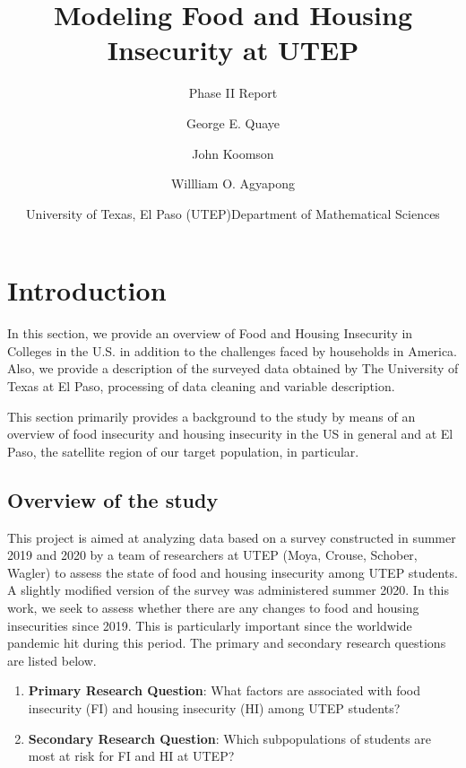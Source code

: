 \documentclass[
  10pt,
]{article}
\title{Modeling Food and Housing Insecurity at UTEP}
\subtitle{Phase II Report}
\author{George E. Quaye \and John Koomson \and Willliam O. Agyapong}
\date{\center University of Texas, El Paso (UTEP)\center \center Department of Mathematical Sciences \center}
\begin{document}
\maketitle

{
\hypersetup{linkcolor=}
\setcounter{tocdepth}{4}
\tableofcontents
}
\newpage

\section{Introduction}

In this section, we provide an overview of Food and Housing Insecurity in Colleges in the U.S. in addition to the challenges faced by households in America. Also, we provide a description of the surveyed data obtained by The University of Texas at El Paso, processing of data cleaning and variable description.

This section primarily provides a background to the study by means of an overview of food insecurity and housing insecurity in the US in general and at El Paso, the satellite region of our target population, in particular.

\hypertarget{overview-of-the-study}{%
\subsection{Overview of the study}\label{overview-of-the-study}}

This project is aimed at analyzing data based on a survey constructed in summer 2019 and 2020 by a team of researchers at UTEP (Moya, Crouse, Schober, Wagler) to assess the state of food and housing insecurity among UTEP students. A slightly modified version of the survey was administered summer 2020. In this work, we seek to assess whether there are any changes to food and housing insecurities since 2019. This is particularly important since the worldwide pandemic hit during this period. The primary and secondary research questions are listed below.

\begin{enumerate}
\def\labelenumi{\arabic{enumi}.}
\item
  \textbf{Primary Research Question}: What factors are associated with food insecurity (FI) and housing insecurity (HI) among UTEP students?
\item
  \textbf{Secondary Research Question}: Which subpopulations of students are most at risk for FI and HI at UTEP?
\end{enumerate}
\end{document}
